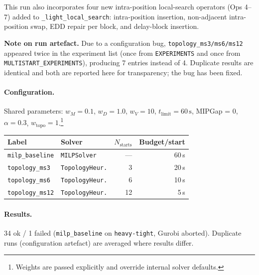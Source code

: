 This run also incorporates four new intra-position local-search operators
(Ops 4–7) added to \texttt{\_light\_local\_search}: intra-position insertion,
non-adjacent intra-position swap, EDD repair per block, and delay-block
insertion.

\textbf{Note on run artefact.}  Due to a configuration bug,
\texttt{topology\_ms3/ms6/ms12} appeared twice in the experiment list
(once from \texttt{EXPERIMENTS} and once from \texttt{MULTISTART\_EXPERIMENTS}),
producing 7 entries instead of 4.  Duplicate results are identical and both are
reported here for transparency; the bug has been fixed.

\paragraph{Configuration.}

Shared parameters: $w_M=0.1$, $w_D=1.0$, $w_V=10$,
$t_{\text{limit}}=60\,\text{s}$, MIPGap = 0, $\alpha=0.3$,
$w_{\text{topo}}=1$.\footnote{Weights are passed explicitly and override
internal solver defaults.}

\begin{center}
\small
\begin{tabular}{llrr}
\toprule
Label & Solver & $N_{\text{starts}}$ & Budget/start \\
\midrule
\texttt{milp\_baseline}  & \texttt{MILPSolver}       & --- & 60\,s \\
\texttt{topology\_ms3}   & \texttt{TopologyHeur.}    & 3   & 20\,s \\
\texttt{topology\_ms6}   & \texttt{TopologyHeur.}    & 6   & 10\,s \\
\texttt{topology\_ms12}  & \texttt{TopologyHeur.}    & 12  & 5\,s  \\
\bottomrule
\end{tabular}
\end{center}

\paragraph{Results.}

34 ok / 1 failed (\texttt{milp\_baseline} on \texttt{heavy-tight}, Gurobi aborted).
Duplicate runs (configuration artefact) are averaged where results differ.

